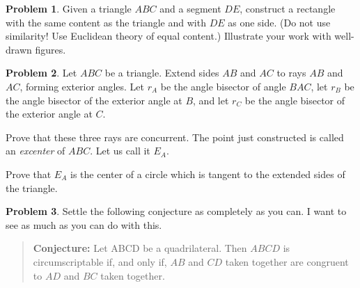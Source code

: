 \documentclass{tufte-handout}
\theoremstyle{definition}
\newtheorem{problem}{Problem}[section]
\begin{document}
\begin{problem} 
Given a triangle $ABC$ and a segment $DE$, construct a rectangle with the same content as the triangle and with $DE$ as one side. 
(Do not use similarity! Use Euclidean theory of equal content.) 
Illustrate your work with well-drawn figures.
\end{problem}

\begin{problem} 
Let $ABC$ be a triangle. 
Extend sides $AB$ and $AC$ to rays $AB$ and $AC$, forming exterior angles. 
Let $r_A$ be the angle bisector of angle $BAC$, let $r_B$ be the angle bisector of the exterior angle at $B$, and let $r_C$ be the angle bisector of the exterior angle at $C$.
\begin{compactitem}
\item Prove that these three rays are concurrent.
The point just constructed is called an \emph{excenter} of $ABC$. 
Let us call it $E_A$.
\item Prove that $E_A$ is the center of a circle which is tangent to the extended sides of the triangle.
\end{compactitem}
\end{problem}

\begin{problem} Settle the following conjecture as completely as you can. I want to see as much as you can do with this.
\begin{quotation}
\textbf{Conjecture:} 
Let ABCD be a quadrilateral. 
Then $ABCD$ is circumscriptable if, and only if, $AB$ and $CD$ taken together are congruent to $AD$ and $BC$ taken together.
\end{quotation}
\end{problem}




\vfill
\end{document}
